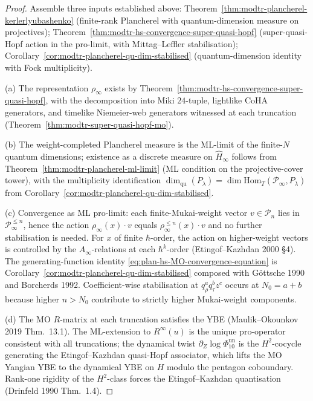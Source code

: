 \begin{proof}
Assemble three inputs established above:
Theorem~\ref{thm:modtr-plancherel-kerlerlyubashenko}
(finite-rank Plancherel with quantum-dimension measure on projectives);
Theorem~\ref{thm:modtr-hs-convergence-super-quasi-hopf}
(super-quasi-Hopf action in the pro-limit, with Mittag--Leffler
stabilisation);
Corollary~\ref{cor:modtr-plancherel-qu-dim-stabilised}
(quantum-dimension identity with Fock multiplicity).

(a) The representation $\rho_\infty$ exists by
Theorem~\ref{thm:modtr-hs-convergence-super-quasi-hopf}, with
the decomposition into Miki $24$-tuple, lightlike CoHA generators, and
timelike Niemeier-web generators witnessed at each truncation
(Theorem~\ref{thm:modtr-super-quasi-hopf-mo}).

(b) The weight-completed Plancherel measure is the ML-limit of the
finite-$N$ quantum dimensions; existence as a discrete measure on
$\widehat H_\infty$ follows from
Theorem~\ref{thm:modtr-plancherel-ml-limit} (ML condition on
the projective-cover tower), with the multiplicity identification
$\dim_{\mathrm{qu}}(P_\lambda) = \dim\mathrm{Hom}_T(\mathcal P_\infty,
P_\lambda)$ from
Corollary~\ref{cor:modtr-plancherel-qu-dim-stabilised}.

(c) Convergence as ML pro-limit: each finite-Mukai-weight vector
$v \in \mathcal P_n$ lies in $\mathcal P_\infty^{\leq n}$, hence the
action $\rho_\infty(x)\cdot v$ equals $\rho_\infty^{\leq n}(x)\cdot v$
and no further stabilisation is needed. For $x$ of finite $\hbar$-order,
the action on higher-weight vectors is controlled by the
$A_\infty$-relations at each $\hbar^k$-order (Etingof--Kazhdan 2000
\S 4). The generating-function identity
\eqref{eq:plan-hs-MO-convergence-equation} is
Corollary~\ref{cor:modtr-plancherel-qu-dim-stabilised} composed
with G\"ottsche 1990 and Borcherds 1992. Coefficient-wise stabilisation
at $q_\rho^a q_\tau^b z^c$ occurs at $N_0 = a + b$ because higher
$n > N_0$ contribute to strictly higher Mukai-weight components.

(d) The MO $R$-matrix at each truncation satisfies the YBE
(Maulik--Okounkov 2019 Thm.~13.1). The ML-extension to $R^\infty(u)$
is the unique pro-operator consistent with all truncations; the
dynamical twist $\partial_Z\log\Phi_{10}^{\mathrm{un}}$ is the $H^2$-cocycle
generating the Etingof--Kazhdan quasi-Hopf associator, which lifts
the MO Yangian YBE to the dynamical YBE on $H$ modulo the pentagon
coboundary. Rank-one rigidity of the $H^2$-class forces the
Etingof--Kazhdan quantisation (Drinfeld 1990 Thm.~1.4).


\end{proof}
